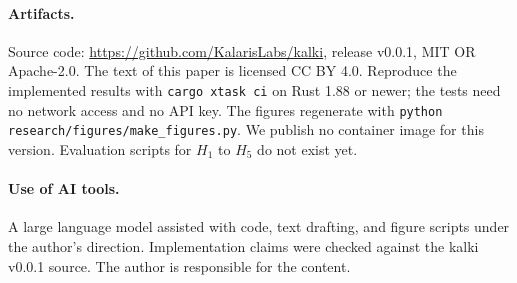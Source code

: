 \documentclass[11pt,a4paper]{article}
\begin{document}
\paragraph{Artifacts.} Source code: \url{https://github.com/KalarisLabs/kalki}, release v0.0.1, MIT OR Apache-2.0. The text of this paper is licensed CC BY 4.0. Reproduce the implemented results with \texttt{cargo xtask ci} on Rust 1.88 or newer; the tests need no network access and no API key. The figures regenerate with \texttt{python research/figures/make\_figures.py}. We publish no container image for this version. Evaluation scripts for $H_1$ to $H_5$ do not exist yet.

\paragraph{Use of AI tools.} A large language model assisted with code, text drafting, and figure scripts under the author's direction. Implementation claims were checked against the kalki v0.0.1 source. The author is responsible for the content.



\end{document}
